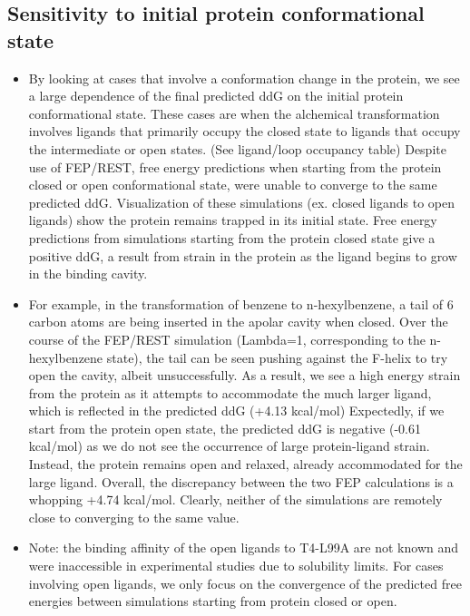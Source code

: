 \documentclass{article}
\begin{document}
\subsection{Sensitivity to initial protein conformational state}
   \begin{itemize}
   \item By looking at cases that involve a conformation change in the protein, we see a large dependence of the final predicted ddG on the initial protein conformational state.
      These cases are when the alchemical transformation involves ligands that primarily occupy the closed state to ligands that occupy the intermediate or open states. (See ligand/loop occupancy table)
      Despite use of FEP/REST, free energy predictions when starting from the protein closed or open conformational state, were unable to converge to the same predicted ddG.
      Visualization of these simulations (ex. closed ligands to open ligands) show the protein remains trapped in its initial state.
      Free energy predictions from simulations starting from the protein closed state give a positive ddG, a result from strain in the protein as the ligand begins to grow in the binding cavity.
   \item For example, in the transformation of benzene to n-hexylbenzene, a tail of 6 carbon atoms are being inserted in the apolar cavity when closed.
      Over the course of the FEP/REST simulation (Lambda=1, corresponding to the n-hexylbenzene state), the tail can be seen pushing against the F-helix to try open the cavity, albeit unsuccessfully.
      As a result, we see a high energy strain from the protein as it attempts to accommodate the much larger ligand, which is reflected in the predicted ddG (+4.13 kcal/mol)
      Expectedly, if we start from the protein open state, the predicted ddG is negative (-0.61 kcal/mol) as we do not see the occurrence of large protein-ligand strain.
      Instead, the protein remains open and relaxed, already accommodated for the large ligand.
      Overall, the discrepancy between the two FEP calculations is a whopping +4.74 kcal/mol.
      Clearly, neither of the simulations are remotely close to converging to the same value. 
   \item Note: the binding affinity of the open ligands to T4-L99A are not known and were inaccessible in experimental studies due to solubility limits. \cite{Merski2015}
      For cases involving open ligands, we only focus on the convergence of the predicted free energies between simulations starting from protein closed or open.

\end{itemize}
\end{document}
